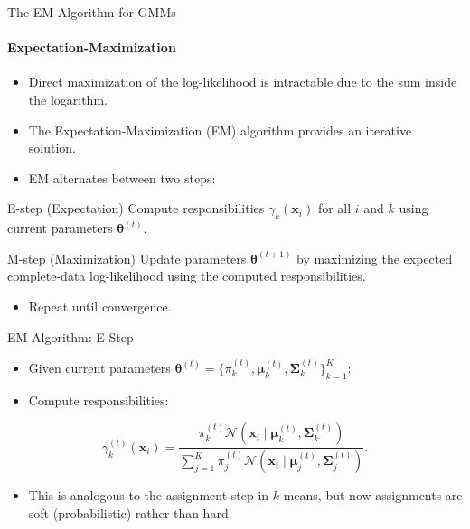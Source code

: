 \begin{frame}{The EM Algorithm for GMMs}
  \framesubtitle{Expectation-Maximization}
  \begin{itemize}
    \item Direct maximization of the log-likelihood is intractable due to the sum inside
          the logarithm.
    \item The \alert{Expectation-Maximization (EM)} algorithm provides an iterative solution.
    \item EM alternates between two steps:
  \end{itemize}
  \begin{block}{E-step (Expectation)}
    Compute responsibilities $\gamma_k(\mathbf{x}_i)$ for all $i$ and $k$ using current
    parameters $\boldsymbol{\theta}^{(t)}$.
  \end{block}
  \begin{block}{M-step (Maximization)}
    Update parameters $\boldsymbol{\theta}^{(t+1)}$ by maximizing the expected complete-data
    log-likelihood using the computed responsibilities.
  \end{block}
  \begin{itemize}
    \item Repeat until convergence.
  \end{itemize}
\end{frame}

\begin{frame}{EM Algorithm: E-Step}
  \begin{itemize}
    \item Given current parameters $\boldsymbol{\theta}^{(t)} = \{\pi_k^{(t)},
          \boldsymbol{\mu}_k^{(t)}, \boldsymbol{\Sigma}_k^{(t)}\}_{k=1}^{K}$:
    \item Compute responsibilities:
  \end{itemize}
  \[
  \gamma_k^{(t)}(\mathbf{x}_i) = \frac{\pi_k^{(t)} \mathcal{N}(\mathbf{x}_i \mid
                                       \boldsymbol{\mu}_k^{(t)},
                                       \boldsymbol{\Sigma}_k^{(t)})}{\sum_{j=1}^{K}
                                       \pi_j^{(t)} \mathcal{N}(\mathbf{x}_i \mid
                                       \boldsymbol{\mu}_j^{(t)},
                                       \boldsymbol{\Sigma}_j^{(t)})}.
  \]
  \begin{itemize}
    \item This is analogous to the assignment step in $k$-means, but now assignments are
          \alert{soft} (probabilistic) rather than hard.
  \end{itemize}
\end{frame}

